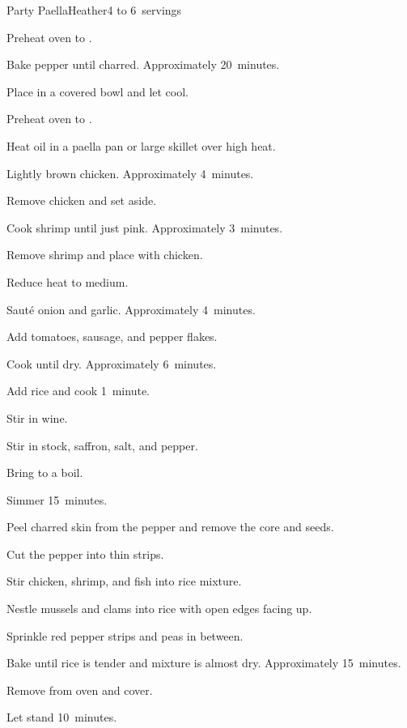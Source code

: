 \begin{recipe}{Party Paella}{Heather}{4 to 6~servings}
\begin{directions}
\item Preheat oven to .
\item Bake pepper until charred. Approximately 20~minutes.
\item Place in a covered bowl and let cool.
\item Preheat oven to .
\item Heat  oil in a paella pan or large skillet over high heat.
\item Lightly brown chicken. Approximately 4~minutes.
\item Remove chicken and set aside.
\item Cook shrimp until just pink. Approximately 3~minutes.
\item Remove shrimp and place with chicken.
\item Reduce heat to medium.
\item Sauté onion and garlic. Approximately 4~minutes.
\item Add tomatoes, sausage, and pepper flakes.
\item Cook until dry. Approximately 6~minutes.
\item Add rice and cook 1~minute.
\item Stir in wine.
\item Stir in stock, saffron, salt, and pepper.
\item Bring to a boil.
\item Simmer 15~minutes.
\item Peel charred skin from the pepper and remove the core and seeds.
\item Cut the pepper into thin strips.
\item Stir chicken, shrimp, and fish into rice mixture.
\item Nestle mussels and clams into rice with open edges facing up.
\item Sprinkle red pepper strips and peas in between.
\item Bake until rice is tender and mixture is almost dry. Approximately 15~minutes.
\item Remove from oven and cover.
\item Let stand 10~minutes.
\end{directions}

\hint{}
\end{recipe}
